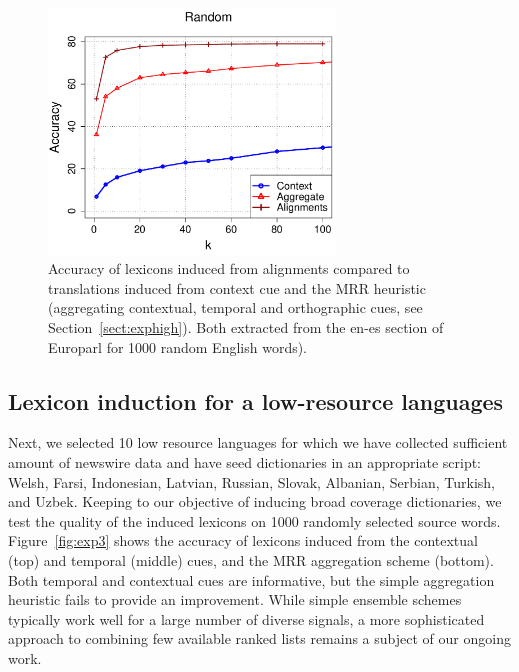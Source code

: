\documentclass{article}
\newcommand{\secref}[1]{Section~\ref{#1}}
\newcommand{\figref}[1]{Figure~\ref{#1}}
\begin{document}
\begin{figure}[h!]
\centerline{\mbox{\includegraphics[width=3in]{figures/exp2/alignvscontext}}}
\caption{Accuracy of lexicons induced from alignments compared to translations induced from context cue and the MRR heuristic (aggregating contextual, temporal and orthographic cues, see \secref{sect:exphigh}).  Both extracted from the en-es section of Europarl for 1000 random English words).} 
\label{fig:exp2}
\end{figure}

\subsection{Lexicon induction for a low-resource languages}

Next, we selected 10 low resource languages for which we have collected sufficient amount of newswire data and have seed dictionaries in an appropriate script: Welsh, Farsi, Indonesian, Latvian, Russian, Slovak, Albanian, Serbian, Turkish, and Uzbek.  Keeping to our objective of inducing broad coverage dictionaries, we test the quality of the induced lexicons on 1000 randomly selected source words. \figref{fig:exp3} shows the accuracy of lexicons induced from the contextual (top) and temporal (middle) cues, and the MRR aggregation scheme (bottom). Both temporal and contextual cues are informative, but the simple aggregation heuristic fails to provide an improvement.  While simple ensemble schemes typically work well for a large number of diverse signals, a more sophisticated approach to combining few available ranked lists remains a subject of our ongoing work.\\
\end{document}
